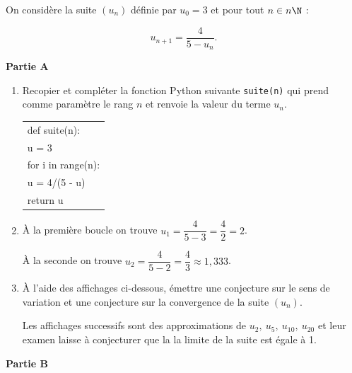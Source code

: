 \medskip





On considère la suite $\left(u_n\right)$ définie par $u_0 = 3$ et pour tout $n \in n\N$ :

\[u_{n+1} = \dfrac{4}{5 - u_n}.\]

\medskip

\textbf{Partie A}

\medskip

\begin{enumerate}
\item Recopier et compléter la fonction Python suivante \texttt{suite(n)} qui prend comme
paramètre le rang $n$ et renvoie la valeur du terme $u_n$.

\begin{center}
\begin{tabular}{|l|}\hline
def suite(n):\\
\qquad u = 3\\
\qquad for i in range(n)\quad  :\\
\qquad \qquad u = 4/(5 - u)\\ 
\qquad return u \\ \hline
\end{tabular}
\end{center}

\item 


À la première boucle on trouve $u_1 = \dfrac{4}{5 - 3} = \dfrac{4}{2} = 2$.


À la seconde on trouve $u_2 = \dfrac{4}{5 - 2} = \dfrac{4}{3}\approx 1,333$.

\item À l'aide des affichages ci-dessous, émettre une conjecture sur le sens de variation et une conjecture sur la convergence de la suite $\left(u_n\right)$.













Les affichages successifs sont des approximations de $u_2, \:u_5,\:u_{10}, \: u_{20}$ et leur examen laisse à conjecturer que la la limite de la suite est égale à 1.
\end{enumerate}

\medskip

\textbf{Partie B}

\medskip

